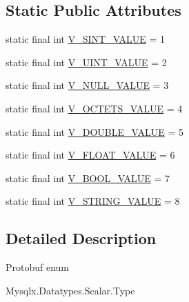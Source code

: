 \subsection*{Static Public Attributes}
\begin{DoxyCompactItemize}
\item 
static final int \mbox{\hyperlink{enumcom_1_1mysql_1_1cj_1_1x_1_1protobuf_1_1_mysqlx_datatypes_1_1_scalar_1_1_type_ac57fe9a1efbc4dbd6ed80175fbaba1cb}{V\+\_\+\+S\+I\+N\+T\+\_\+\+V\+A\+L\+UE}} = 1
\item 
static final int \mbox{\hyperlink{enumcom_1_1mysql_1_1cj_1_1x_1_1protobuf_1_1_mysqlx_datatypes_1_1_scalar_1_1_type_a984079811052e9ab9d4a69b1a3fc29f2}{V\+\_\+\+U\+I\+N\+T\+\_\+\+V\+A\+L\+UE}} = 2
\item 
static final int \mbox{\hyperlink{enumcom_1_1mysql_1_1cj_1_1x_1_1protobuf_1_1_mysqlx_datatypes_1_1_scalar_1_1_type_ad901d54ebe629c8974cc7c759a386682}{V\+\_\+\+N\+U\+L\+L\+\_\+\+V\+A\+L\+UE}} = 3
\item 
static final int \mbox{\hyperlink{enumcom_1_1mysql_1_1cj_1_1x_1_1protobuf_1_1_mysqlx_datatypes_1_1_scalar_1_1_type_a25fa8190bed0fe9bba3a26509d643d82}{V\+\_\+\+O\+C\+T\+E\+T\+S\+\_\+\+V\+A\+L\+UE}} = 4
\item 
static final int \mbox{\hyperlink{enumcom_1_1mysql_1_1cj_1_1x_1_1protobuf_1_1_mysqlx_datatypes_1_1_scalar_1_1_type_a18d9435eb92e80059742cb3352dea2c4}{V\+\_\+\+D\+O\+U\+B\+L\+E\+\_\+\+V\+A\+L\+UE}} = 5
\item 
static final int \mbox{\hyperlink{enumcom_1_1mysql_1_1cj_1_1x_1_1protobuf_1_1_mysqlx_datatypes_1_1_scalar_1_1_type_ae7d502544f12e862e1fdd50ce28be17f}{V\+\_\+\+F\+L\+O\+A\+T\+\_\+\+V\+A\+L\+UE}} = 6
\item 
static final int \mbox{\hyperlink{enumcom_1_1mysql_1_1cj_1_1x_1_1protobuf_1_1_mysqlx_datatypes_1_1_scalar_1_1_type_a9c58f6b103ccd4da8c5b21dcbf5ff157}{V\+\_\+\+B\+O\+O\+L\+\_\+\+V\+A\+L\+UE}} = 7
\item 
static final int \mbox{\hyperlink{enumcom_1_1mysql_1_1cj_1_1x_1_1protobuf_1_1_mysqlx_datatypes_1_1_scalar_1_1_type_a9dfd3901e677a1c888e3403dee581f90}{V\+\_\+\+S\+T\+R\+I\+N\+G\+\_\+\+V\+A\+L\+UE}} = 8
\end{DoxyCompactItemize}


\subsection{Detailed Description}
Protobuf enum
\begin{DoxyCode}
Mysqlx.Datatypes.Scalar.Type 
\end{DoxyCode}
 


